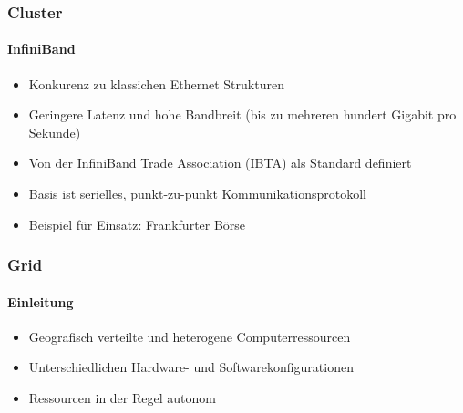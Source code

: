 \begin{frame}
  \frametitle{Cluster}
  \framesubtitle{InfiniBand }
  \begin{itemize}
    \item Konkurenz zu klassichen Ethernet Strukturen
    \item Geringere Latenz und hohe Bandbreit (bis zu mehreren hundert Gigabit pro Sekunde)
    \item Von der InfiniBand Trade Association (IBTA) als Standard definiert
    \item Basis ist serielles, punkt-zu-punkt Kommunikationsprotokoll
    \item Beispiel für Einsatz: Frankfurter Börse
  \end{itemize}
\end{frame}

\begin{frame}
  \frametitle{Grid}
  \framesubtitle{Einleitung }
  \begin{itemize}
    \item Geografisch verteilte und heterogene Computerressourcen
    \item Unterschiedlichen Hardware- und Softwarekonfigurationen
    \item Ressourcen in der Regel autonom
  \end{itemize}
\end{frame}